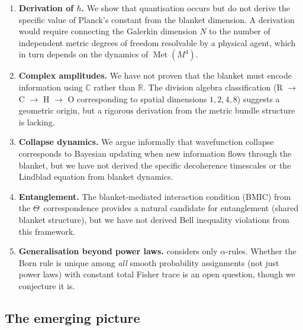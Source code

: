 \documentclass[12pt,a4paper]{article}
\theoremstyle{definition}
\newcommand{\Met}{\operatorname{Met}}
\newcommand{\R}{\mathbb{R}}
\newcommand{\C}{\mathbb{C}}
\begin{document}
\begin{enumerate}
\item \textbf{Derivation of $\hbar$.} We show that quantisation occurs
  but do not derive the specific value of Planck's constant from the
  blanket dimension. A derivation would require connecting the Galerkin
  dimension $N$ to the number of independent metric degrees of freedom
  resolvable by a physical agent, which in turn depends on the
  dynamics of $\Met(M^4)$.

\item \textbf{Complex amplitudes.} We have not proven that the blanket
  must encode information using $\C$ rather than $\R$. The division
  algebra classification (R $\to$ C $\to$ H $\to$ O corresponding to
  spatial dimensions $1, 2, 4, 8$) suggests a geometric origin, but a
  rigorous derivation from the metric bundle structure is lacking.

\item \textbf{Collapse dynamics.} We argue informally that wavefunction
  collapse corresponds to Bayesian updating when new information flows
  through the blanket, but we have not derived the specific decoherence
  timescales or the Lindblad equation from blanket dynamics.

\item \textbf{Entanglement.} The blanket-mediated interaction condition
  (BMIC) from the $\Theta$~correspondence \cite{Paper0a,Paper0b}
  provides a natural candidate for entanglement (shared blanket
  structure), but we have not derived Bell inequality violations from
  this framework.

\item \textbf{Generalisation beyond power laws.}
   considers only $\alpha$-rules. Whether
  the Born rule is unique among \emph{all} smooth probability
  assignments (not just power laws) with constant total Fisher trace
  is an open question, though we conjecture it is.
\end{enumerate}

\subsection{The emerging picture}
\end{document}
